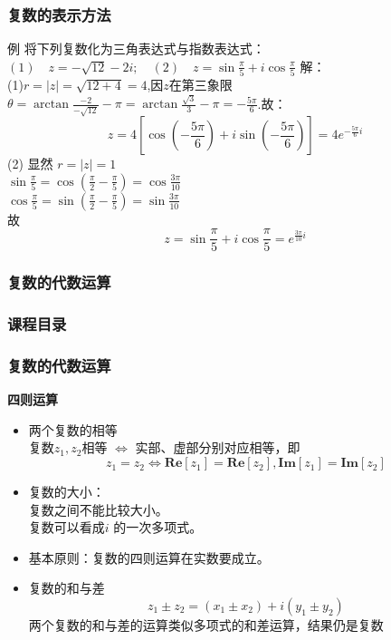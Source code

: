 \documentclass{beamer}
\begin{document}
\begin{frame}
\frametitle{复数的表示方法}
\begin{exampleblock}{例 将下列复数化为三角表达式与指数表达式： \\ $(1)\quad z = -\sqrt{12} -2i; \quad(2) \quad z= \sin{\frac{\pi}{5}} + i \cos{\frac{\pi}{5}}$}
解：\\
(1)$ r = |z| =\sqrt{12+4} =4$,因$z$在第三象限\\
$\theta = \arctan{\frac{-2}{-\sqrt{12}}} - \pi = \arctan{\frac{\sqrt{3}}{3}}- \pi = -\frac{5\pi}{6}$.故：\\
$$z = 4 \left[ \cos{\left (-\frac{5\pi}{6}\right )} + i \sin{\left( -\frac{5\pi}{6} \right ) }  \right] = 4 e^{-\frac{5\pi}{6}i}$$
(2) 显然 $r = |z| =1$\\
$\sin{\frac{\pi}{5}} = \cos{ \left ( \frac{\pi}{2} - \frac{\pi}{5} \right) } = \cos{\frac{3\pi}{10}}$\\
$\cos{\frac{\pi}{5}} = \sin{ \left ( \frac{\pi}{2} - \frac{\pi}{5} \right) } = \sin{\frac{3\pi}{10}}$\\
故
$$z = \sin{\frac{\pi}{5}} + i \cos{\frac{\pi}{5}} = e^{\frac{3\pi}{10} i}$$
\end{exampleblock}
\end{frame}

\subsubsection{复数的代数运算}
\begin{frame}[t]
\frametitle{课程目录}
\tableofcontents[currentsubsection ] %
\end{frame}

\begin{frame}[t]
\frametitle{复数的代数运算}
\textbf{四则运算}
\begin{itemize}
\item{两个复数的相等}
\\复数$z_1,z_2$相等 $\Leftrightarrow$ 实部、虚部分别对应相等，即  $$z_1 = z_2 \Leftrightarrow \mathbf{Re}[z_1] = \mathbf{Re}[z_2],  \mathbf{Im}[z_1] = \mathbf{Im}[z_2]$$

\item{复数的大小：}
\\复数之间不能比较大小。
\\复数可以看成$i$ 的一次多项式。
\item 基本原则：复数的四则运算在实数要成立。
\item 复数的和与差
$$z_1\pm z_2 = (x_1 \pm x_2) + i (y_1 \pm y_2)$$
两个复数的和与差的运算类似多项式的和差运算，结果仍是复数

\end{itemize}
\end{frame}
\end{document}

